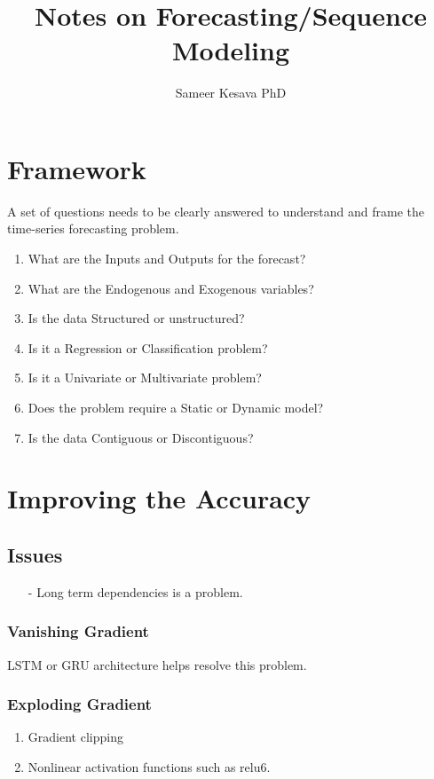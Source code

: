 \documentclass[a4paper, 12pt]{report}
\begin{document}
\title{Notes on Forecasting/Sequence Modeling}
\author{Sameer Kesava PhD}
\date{} %
\maketitle

\tableofcontents
\newpage



\chapter{Framework}
A set of questions needs to be clearly answered to understand and frame the time-series forecasting problem.

\begin{enumerate}
\item What are the Inputs and Outputs for the forecast?
\item What are the Endogenous and Exogenous variables?
\item Is the data Structured or unstructured?
\item Is it a Regression or Classification problem?
\item Is it a Univariate or Multivariate problem?
\item Does the problem require a Static or Dynamic model?
\item Is the data Contiguous or Discontiguous?
\end{enumerate}

\chapter{Improving the Accuracy}
\section{Issues}
\label{sec:issues}
\begin{itemize}
\item[-] Long term dependencies is a problem.
\end{itemize}

\subsection{Vanishing Gradient}
LSTM or GRU architecture helps resolve this problem.

\subsection{Exploding Gradient}
\begin{enumerate}
\item Gradient clipping
\item Nonlinear activation functions such as relu6.
\end{enumerate}
\end{document}
